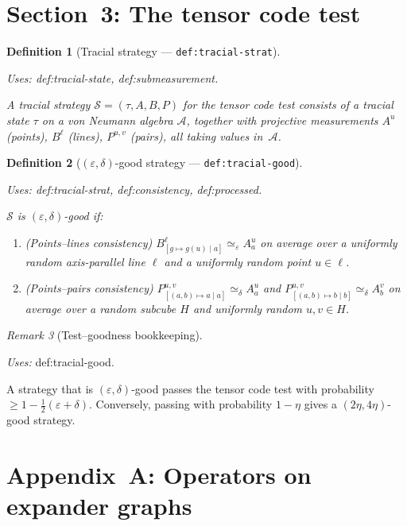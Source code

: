 \documentclass{article}
\providecommand{\uses}[1]{\par\smallskip\noindent\emph{Uses:} #1.\par\smallskip}
\newtheorem{definition}{Definition}[section]
\theoremstyle{remark}
\newtheorem{remark}[definition]{Remark}
\newcommand{\algebra}{\mathcal{A}}
\newcommand{\eps}{\varepsilon}
\begin{document}
\section{Section~3: The tensor code test}
\label{sec:test}

\begin{definition}[Tracial strategy --- \texttt{def:tracial-strat}]\label{def:tracial-strat}
	\uses{def:tracial-state, def:submeasurement}
	A tracial strategy $\mathcal{S}=(\tau,A,B,P)$ for the tensor code test
	consists of a tracial state $\tau$ on a von Neumann algebra $\algebra$,
	together with projective measurements $A^u$ (points), $B^\ell$ (lines),
	$P^{u,v}$ (pairs), all taking values in~$\algebra$.
\end{definition}

\begin{definition}[$(\eps,\delta)$-good strategy --- \texttt{def:tracial-good}]
	\label{def:tracial-good}
	\uses{def:tracial-strat, def:consistency, def:processed}
	$\mathcal{S}$ is $(\eps,\delta)$-good if:
	\begin{enumerate}
		\item (Points--lines consistency)
		      $B^\ell_{[g\mapsto g(u)\mid a]}\simeq_\eps A^u_a$
		      on average over a uniformly random axis-parallel line $\ell$ and
		      a uniformly random point $u\in\ell$.
		\item (Points--pairs consistency)
		      $P^{u,v}_{[(a,b)\mapsto a\mid a]}\simeq_\delta A^u_a$
		      and
		      $P^{u,v}_{[(a,b)\mapsto b\mid b]}\simeq_\delta A^v_b$
		      on average over a random subcube $H$ and uniformly random $u,v\in H$.
	\end{enumerate}
\end{definition}

\begin{remark}[Test--goodness bookkeeping]\label{rmk:test-goodness}
	\uses{def:tracial-good}
	A strategy that is $(\eps,\delta)$-good passes the tensor code test with
	probability $\ge 1-\frac12(\eps+\delta)$.
	Conversely, passing with probability $1-\eta$ gives a
	$(2\eta,4\eta)$-good strategy.
\end{remark}

\section{Appendix~A: Operators on expander graphs}
\label{sec:appendix}
\end{document}

